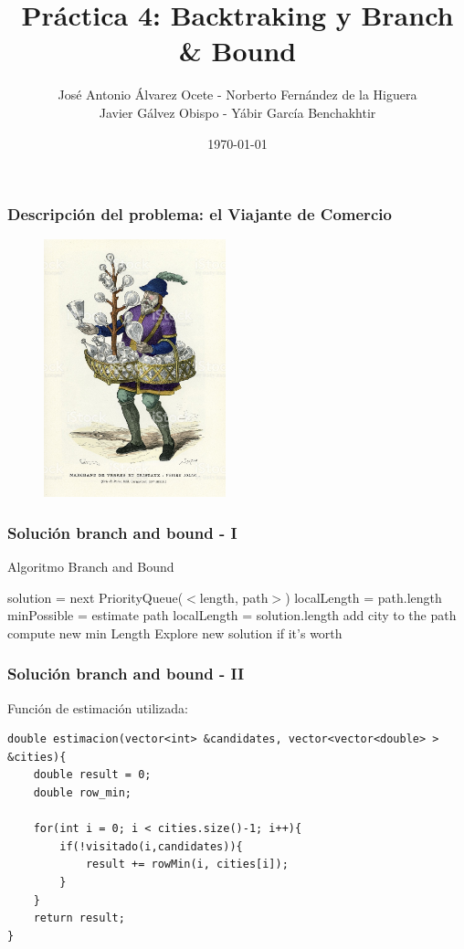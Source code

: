 \documentclass[spanish]{beamer}
\title{Práctica 4: Backtraking y Branch \& Bound}
\date{\today}
\author{José Antonio Álvarez Ocete - Norberto Fernández de la Higuera \\ Javier Gálvez Obispo - Yábir García Benchakhtir }
\institute{Doble Grado en Ingeniería Informática y Matemáticas}
\begin{document}
\frame{\titlepage}

\begin{frame}[fragile]\frametitle{Descripción del problema: el Viajante de Comercio}
\begin{figure}[H]
	\centering
	\includegraphics[width=0.47\textwidth]{comerciante.jpg}
	\caption{}
\end{figure}
\end{frame}

\begin{frame}[fragile]\frametitle{Solución branch and bound - I}
\begin{algorithm}[H]
	\caption{Algoritmo Branch and Bound}
	\begin{algorithmic}
		\State solution = next PriorityQueue($<$length, path$>$)
		\State localLength = path.length
		\Else
		\State minPossible = estimate path
		\State localLength = solution.length
		\EndIf
		\State add city to the path
		\State compute new min Length
		\State Explore new solution if it's worth
		\EndFor
		\EndIf
	\end{algorithmic}
\end{algorithm}
\end{frame}

\begin{frame}[fragile]\frametitle{Solución branch and bound - II}
	
Función de estimación utilizada:
	
\begin{lstlisting}
double estimacion(vector<int> &candidates, vector<vector<double> > &cities){
	double result = 0;
	double row_min;
	
	for(int i = 0; i < cities.size()-1; i++){
		if(!visitado(i,candidates)){
			result += rowMin(i, cities[i]);
		}
	}
	return result;
}
\end{lstlisting}
	
\end{frame}
\end{document}
